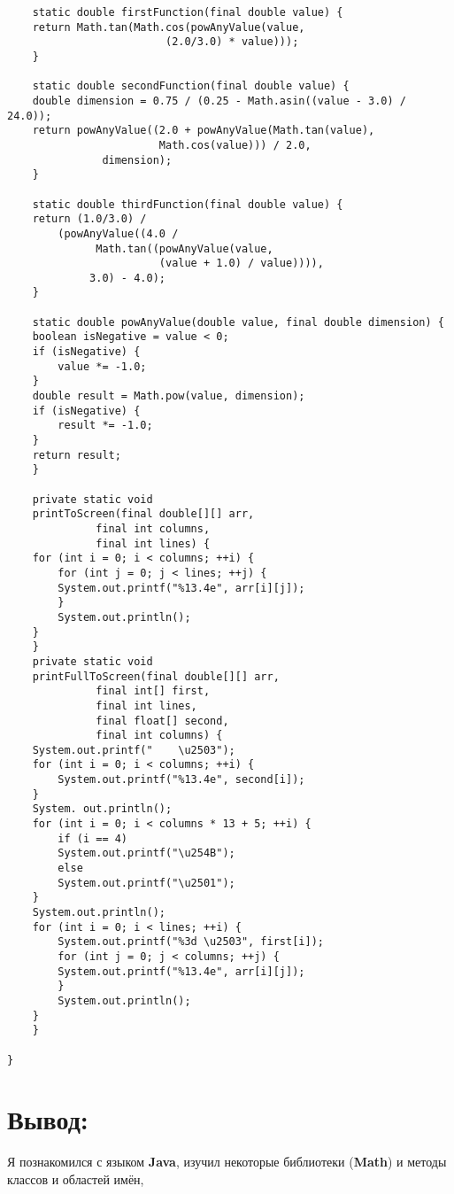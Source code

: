 \documentclass[11pt]{article}
\begin{document}
\begin{lstlisting}
    static double firstFunction(final double value) {
	return Math.tan(Math.cos(powAnyValue(value,
					     (2.0/3.0) * value)));
    }

    static double secondFunction(final double value) {
	double dimension = 0.75 / (0.25 - Math.asin((value - 3.0) / 24.0));
	return powAnyValue((2.0 + powAnyValue(Math.tan(value),
					    Math.cos(value))) / 2.0,
			   dimension);
    }

    static double thirdFunction(final double value) {
	return (1.0/3.0) /
	    (powAnyValue((4.0 /
			  Math.tan((powAnyValue(value,
						(value + 1.0) / value)))),
			 3.0) - 4.0);
    }

    static double powAnyValue(double value, final double dimension) {
	boolean isNegative = value < 0;
	if (isNegative) {
	    value *= -1.0;
	}
	double result = Math.pow(value, dimension);
	if (isNegative) {
	    result *= -1.0;
	}
	return result;
    }

    private static void
	printToScreen(final double[][] arr,
		      final int columns,
		      final int lines) {
	for (int i = 0; i < columns; ++i) {
	    for (int j = 0; j < lines; ++j) {
		System.out.printf("%13.4e", arr[i][j]);
	    }
	    System.out.println();
	}
    }
    private static void
	printFullToScreen(final double[][] arr,
			  final int[] first,
			  final int lines,
			  final float[] second,
			  final int columns) {
	System.out.printf("    \u2503");
	for (int i = 0; i < columns; ++i) {
	    System.out.printf("%13.4e", second[i]);
	}
	System.	out.println();
	for (int i = 0; i < columns * 13 + 5; ++i) {
	    if (i == 4)
		System.out.printf("\u254B");
	    else
		System.out.printf("\u2501");
	}
	System.out.println();
	for (int i = 0; i < lines; ++i) {
	    System.out.printf("%3d \u2503", first[i]);
	    for (int j = 0; j < columns; ++j) {
		System.out.printf("%13.4e", arr[i][j]);
	    }
	    System.out.println();
	}
    }

}
\end{lstlisting}
\pagebreak{} \large
\section{Вывод:}
\label{sec:org86b5a10}
Я познакомился с языком \textbf{Java}, изучил некоторые библиотеки (\textbf{Math}) и методы классов и областей имён, 
\end{document}

